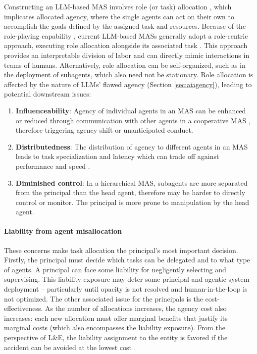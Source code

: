 \documentclass[11pt]{article}
\begin{document}
Constructing an LLM-based MAS involves role (or task) allocation \citep{campbell_mas_2011,guo_large_2024,tran_multiagent_2025}, which implicates allocated agency, where the single agents can act on their own to accomplish the goals defined by the assigned task and resources. Because of the role-playing capability \citep{Shanahan2023,chen_persona_2024}, current LLM-based MASs generally adopt a role-centric approach, executing role allocation alongside its associated task \citep{guo_large_2024,tran_multiagent_2025}. This approach provides an interpretable division of labor and can directly mimic interactions in teams of humans. Alternatively, role allocation can be self-organized, such as in the deployment of subagents, which also need not be stationary. Role allocation is affected by the nature of LLMs' flawed agency (Section \ref{sec:aiagency}), leading to potential downstream issues:
\begin{enumerate}[wide, labelindent=0pt, itemsep=-4pt, topsep=1pt]
    \item[\textbullet] \textbf{Influenceability}: Agency of individual agents in an MAS can be enhanced or reduced through communication with other agents in a cooperative MAS \citep{he_redteaming_2025}, therefore triggering agency shift or unanticipated conduct.
    \item[\textbullet] \textbf{Distributedness}: The distribution of agency to different agents in an MAS leads to task specialization and latency which can trade off against performance and speed \citep{mieczkowski_tradeoff_2025}.
    \item[\textbullet] \textbf{Diminished control}: In a hierarchical MAS, subagents are more separated from the principal than the head agent, therefore may be harder to directly control or monitor. The principal is more prone to manipulation by the head agent.
\end{enumerate}


\paragraph{Liability from agent misallocation} These concerns make task allocation the principal's most important decision.  Firstly, the principal must decide which tasks can be delegated and to what type of agents.  A principal can face some liability for negligently selecting and supervising.  This liability exposure may deter some principal and agentic system deployment -- particularly until opacity is not resolved and human-in-the-loop is not optimized.  The other associated issue for the principals is the cost-effectiveness. As the number of allocations increases, the agency cost also increases: each new allocation must offer marginal benefits that justify its marginal costs (which also encompasses the liability exposure). From the perspective of L\&E, the liability assignment to the entity is favored if the accident can be avoided at the lowest cost \citep{calabresi1972property, carbonara2016sharing}.
\end{document}
